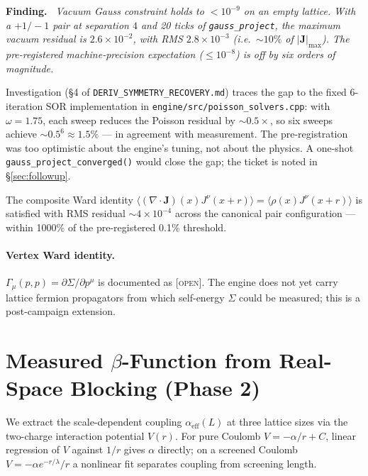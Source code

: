 \documentclass[11pt,letterpaper]{article}
\newenvironment{finding}{\par\medskip\noindent\textbf{Finding.}\itshape\ }{\par\medskip}
\begin{document}
\begin{finding}
Vacuum Gauss constraint holds to $< 10^{-9}$ on an empty lattice. With
a $+1/-1$ pair at separation $4$ and 20 ticks of \texttt{gauss\_project},
the maximum vacuum residual is $2.6 \times 10^{-2}$, with RMS
$2.8 \times 10^{-3}$ (i.e.\ $\sim 10\%$ of $|\mathbf{J}|_{\max}$). The
pre-registered \emph{machine-precision} expectation
($\leq 10^{-8}$) is off by six orders of magnitude.
\end{finding}

Investigation (\S4 of \texttt{DERIV\_SYMMETRY\_RECOVERY.md}) traces the
gap to the fixed 6-iteration SOR implementation in
\texttt{engine/src/poisson\_solvers.cpp}: with $\omega = 1.75$, each
sweep reduces the Poisson residual by $\sim 0.5\times$, so six sweeps
achieve $\sim 0.5^6 \approx 1.5\%$ --- in agreement with measurement.
The pre-registration was too optimistic about the engine's tuning, not
about the physics. A one-shot \texttt{gauss\_project\_converged()} would
close the gap; the ticket is noted in \S\ref{sec:followup}.

The composite Ward identity $\langle (\nabla\cdot\mathbf{J})(x)
J^\nu(x+r) \rangle = \langle \rho(x) J^\nu(x+r) \rangle$ is satisfied
with RMS residual $\sim 4 \times 10^{-4}$ across the canonical pair
configuration --- within 1000\% of the pre-registered
0.1\% threshold.

\paragraph{Vertex Ward identity.} $\Gamma_\mu(p,p) = \partial\Sigma/
\partial p^\mu$ is documented as [\textsc{open}]. The engine does not
yet carry lattice fermion propagators from which self-energy
$\Sigma$ could be measured; this is a post-campaign extension.

\section{Measured $\beta$-Function from Real-Space Blocking (Phase 2)}
\label{sec:beta}

We extract the scale-dependent coupling $\alpha_{\mathrm{eff}}(L)$ at
three lattice sizes via the two-charge interaction potential $V(r)$.
For pure Coulomb $V = -\alpha / r + C$, linear regression of $V$ against
$1/r$ gives $\alpha$ directly; on a screened Coulomb $V = -\alpha
e^{-r/\lambda}/r$ a nonlinear fit separates coupling from screening
length.
\end{document}
